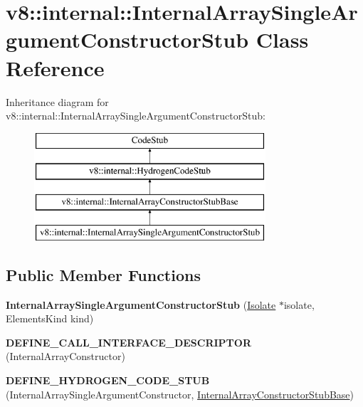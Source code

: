 \hypertarget{classv8_1_1internal_1_1_internal_array_single_argument_constructor_stub}{}\section{v8\+:\+:internal\+:\+:Internal\+Array\+Single\+Argument\+Constructor\+Stub Class Reference}
\label{classv8_1_1internal_1_1_internal_array_single_argument_constructor_stub}
Inheritance diagram for v8\+:\+:internal\+:\+:Internal\+Array\+Single\+Argument\+Constructor\+Stub\+:\begin{figure}[H]
\begin{center}
\leavevmode
\includegraphics[height=4.000000cm]{classv8_1_1internal_1_1_internal_array_single_argument_constructor_stub}
\end{center}
\end{figure}
\subsection*{Public Member Functions}
\begin{DoxyCompactItemize}
\item 
{\bfseries Internal\+Array\+Single\+Argument\+Constructor\+Stub} (\hyperlink{classv8_1_1internal_1_1_isolate}{Isolate} $\ast$isolate, Elements\+Kind kind)\hypertarget{classv8_1_1internal_1_1_internal_array_single_argument_constructor_stub_acc7d7a17af98dfff458a10265d9e8c0e}{}\label{classv8_1_1internal_1_1_internal_array_single_argument_constructor_stub_acc7d7a17af98dfff458a10265d9e8c0e}

\item 
{\bfseries D\+E\+F\+I\+N\+E\+\_\+\+C\+A\+L\+L\+\_\+\+I\+N\+T\+E\+R\+F\+A\+C\+E\+\_\+\+D\+E\+S\+C\+R\+I\+P\+T\+OR} (Internal\+Array\+Constructor)\hypertarget{classv8_1_1internal_1_1_internal_array_single_argument_constructor_stub_a6a7ebd12e026a8939a6d5c5ee4a6339a}{}\label{classv8_1_1internal_1_1_internal_array_single_argument_constructor_stub_a6a7ebd12e026a8939a6d5c5ee4a6339a}

\item 
{\bfseries D\+E\+F\+I\+N\+E\+\_\+\+H\+Y\+D\+R\+O\+G\+E\+N\+\_\+\+C\+O\+D\+E\+\_\+\+S\+T\+UB} (Internal\+Array\+Single\+Argument\+Constructor, \hyperlink{classv8_1_1internal_1_1_internal_array_constructor_stub_base}{Internal\+Array\+Constructor\+Stub\+Base})\hypertarget{classv8_1_1internal_1_1_internal_array_single_argument_constructor_stub_a154c81f055c503857b028c52d659a6d0}{}\label{classv8_1_1internal_1_1_internal_array_single_argument_constructor_stub_a154c81f055c503857b028c52d659a6d0}

\end{DoxyCompactItemize}
